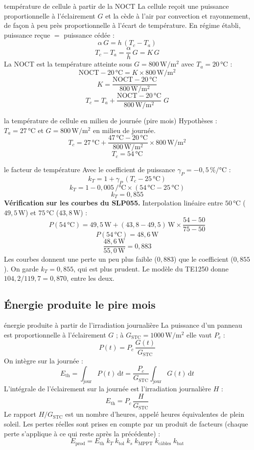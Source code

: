 \documentclass[11pt,a4paper]{article}
\newcommand{\U}[1]{\,\mathrm{#1}}
\begin{document}
\begin{demo}{température de cellule à partir de la NOCT}
La cellule reçoit une puissance proportionnelle à l'éclairement $G$ et la cède à l'air par convection et rayonnement, de façon à peu près proportionnelle à l'écart de température. En régime établi, puissance reçue $=$ puissance cédée :
\[
\alpha \, G = h \, (T_c - T_a)
\]
\[
T_c - T_a = \frac{\alpha}{h} \, G = K \, G
\]
La NOCT est la température atteinte sous $G = 800\U{W/m^2}$ avec $T_a = 20\U{°C}$ :
\[
\text{NOCT} - 20\U{°C} = K \times 800\U{W/m^2}
\]
\[
K = \frac{\text{NOCT} - 20\U{°C}}{800\U{W/m^2}}
\]
\[
T_c = T_a + \frac{\text{NOCT} - 20\U{°C}}{800\U{W/m^2}} \; G
\]
\end{demo}

\begin{calcul}{la température de cellule en milieu de journée (pire mois)}
Hypothèses : $T_a = 27\U{°C}$ et $G = 800\U{W/m^2}$ en milieu de journée.
\[
T_c = 27\U{°C} + \frac{47\U{°C} - 20\U{°C}}{800\U{W/m^2}} \times 800\U{W/m^2}
\]
\[
T_c = 54\U{°C}
\]
\end{calcul}

\begin{calcul}{le facteur de température}
Avec le coefficient de puissance $\gamma_P = -0{,}5\U{\%/°C}$ :
\[
k_T = 1 + \gamma_P \, (T_c - 25\U{°C})
\]
\[
k_T = 1 - 0{,}005\U{/°C} \times (54\U{°C} - 25\U{°C})
\]
\[
k_T = 0{,}855
\]
\textbf{Vérification sur les courbes du SLP055.} Interpolation linéaire entre $50\U{°C}$ ($49{,}5\U{W}$) et $75\U{°C}$ ($43{,}8\U{W}$) :
\[
P(54\U{°C}) = 49{,}5\U{W} + (43{,}8 - 49{,}5)\U{W} \times \frac{54 - 50}{75 - 50}
\]
\[
P(54\U{°C}) = 48{,}6\U{W}
\]
\[
\frac{48{,}6\U{W}}{55{,}0\U{W}} = 0{,}883
\]
Les courbes donnent une perte un peu plus faible ($0{,}883$) que le coefficient ($0{,}855$). On garde $k_T = 0{,}855$, qui est plus prudent. Le modèle du TE1250 donne $104{,}2 / 119{,}7 = 0{,}870$, entre les deux.
\end{calcul}

\subsection{Énergie produite le pire mois}

\begin{demo}{énergie produite à partir de l'irradiation journalière}
La puissance d'un panneau est proportionnelle à l'éclairement $G$ ; à $G_{\text{STC}} = 1000\U{W/m^2}$ elle vaut $P_c$ :
\[
P(t) = P_c \, \frac{G(t)}{G_{\text{STC}}}
\]
On intègre sur la journée :
\[
E_{\text{th}} = \int_{\text{jour}} P(t) \, \mathrm{d}t = \frac{P_c}{G_{\text{STC}}} \int_{\text{jour}} G(t)\,\mathrm{d}t
\]
L'intégrale de l'éclairement sur la journée est l'irradiation journalière $H$ :
\[
E_{\text{th}} = P_c \, \frac{H}{G_{\text{STC}}}
\]
Le rapport $H / G_{\text{STC}}$ est un nombre d'heures, appelé heures équivalentes de plein soleil. Les pertes réelles sont prises en compte par un produit de facteurs (chaque perte s'applique à ce qui reste après la précédente) :
\[
E_{\text{prod}} = E_{\text{th}} \; k_T \; k_{\text{tol}} \; k_s \; k_{\text{MPPT}} \; k_{\text{câbles}} \; k_{\text{bat}}
\]
\end{demo}
\end{document}
